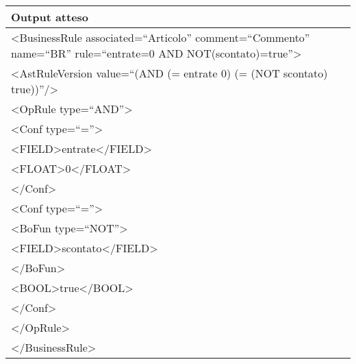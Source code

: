 \begin{center}
\begin{tabular}{|p{11cm}|} \hline
\textbf{Output atteso}\\ \hline
\textless BusinessRule associated=``Articolo'' comment=``Commento'' name=``BR'' rule=``entrate=0 AND NOT(scontato)=true''\textgreater \\
\textless AstRuleVersion value=``(AND (= entrate 0) (= (NOT scontato) true))''/\textgreater \\
 \textless OpRule type=``AND''\textgreater \\
 \textless Conf type=``=''\textgreater \\
 \textless FIELD\textgreater entrate\textless /FIELD\textgreater \\
 \textless FLOAT\textgreater 0\textless /FLOAT\textgreater \\
 \textless /Conf\textgreater \\
 \textless Conf type=``=''\textgreater \\
\textless BoFun type=``NOT''\textgreater \\
 \textless FIELD\textgreater scontato\textless /FIELD\textgreater \\
\textless /BoFun\textgreater \\
 \textless BOOL\textgreater true\textless /BOOL\textgreater \\
\textless /Conf\textgreater \\
\textless /OpRule\textgreater \\
\textless /BusinessRule\textgreater \\
 \hline
\end{tabular} \\
\end{center}

